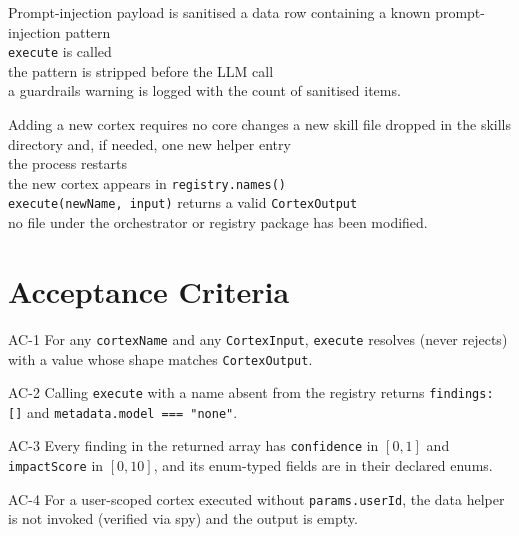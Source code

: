 \begin{scenario}{Prompt-injection payload is sanitised}
\Given a data row containing a known prompt-injection pattern \\
\When \texttt{execute} is called \\
\Then the pattern is stripped before the LLM call \\
\And a guardrails warning is logged with the count of sanitised items.
\end{scenario}

\begin{scenario}{Adding a new cortex requires no core changes}
\Given a new skill file dropped in the skills directory and, if needed, one new helper entry \\
\When the process restarts \\
\Then the new cortex appears in \texttt{registry.names()} \\
\And \texttt{execute(newName, input)} returns a valid \texttt{CortexOutput} \\
\And no file under the orchestrator or registry package has been modified.
\end{scenario}

\section{Acceptance Criteria}

\begin{ac}{AC-1}
For any \texttt{cortexName} and any \texttt{CortexInput}, \texttt{execute} resolves (never rejects) with a value whose shape matches \texttt{CortexOutput}.
\end{ac}

\begin{ac}{AC-2}
Calling \texttt{execute} with a name absent from the registry returns \texttt{findings: []} and \texttt{metadata.model === "none"}.
\end{ac}

\begin{ac}{AC-3}
Every finding in the returned array has \texttt{confidence} in $[0, 1]$ and \texttt{impactScore} in $[0, 10]$, and its enum-typed fields are in their declared enums.
\end{ac}

\begin{ac}{AC-4}
For a user-scoped cortex executed without \texttt{params.userId}, the data helper is not invoked (verified via spy) and the output is empty.
\end{ac}


